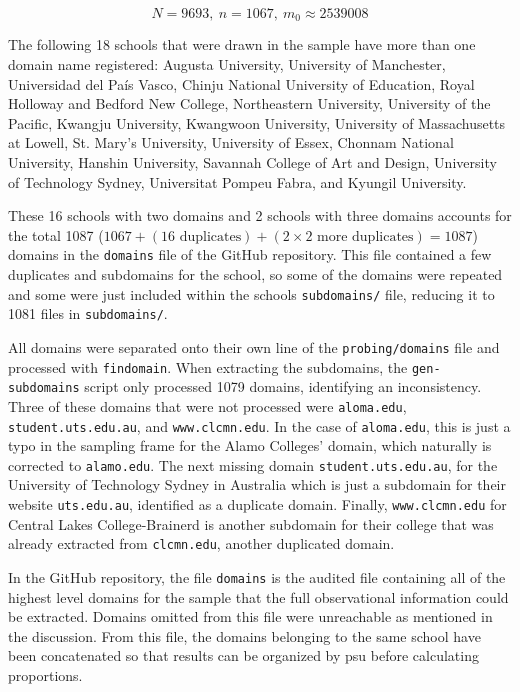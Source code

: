 \documentclass{article}
\theoremstyle{definition}
\begin{document}
\begin{flushleft}
\begin{multicols}{2}
$$
	N=9693, \ n=1067, \ m_0\approx2539008
$$

The following 18 schools that were drawn in the sample
have more than one domain name registered:
Augusta University,
University of Manchester,
Universidad del País Vasco,
Chinju National University of Education,
Royal Holloway and Bedford New College,
Northeastern University,
University of the Pacific,
Kwangju University,
Kwangwoon University,
University of Massachusetts at Lowell,
St. Mary's University,
University of Essex,
Chonnam National University,
Hanshin University,
Savannah College of Art and Design,
University of Technology Sydney,
Universitat Pompeu Fabra, and
Kyungil University.

These 16 schools with two domains and 2 schools with three domains
accounts for the total 1087 ($1067 + (16 \textrm{ duplicates}) +
(2\times2 \textrm{ more duplicates}) = 1087$) domains in the
\texttt{domains} file of the GitHub repository. This file
contained a few duplicates and subdomains for the school,
so some of the domains were repeated and some were just included within
the schools \texttt{subdomains/} file, reducing it to 1081 files
in \texttt{subdomains/}.

All domains were separated onto their own line of the \texttt{probing/domains}
file and processed with \texttt{findomain}.
When extracting the subdomains, the \texttt{gen-subdomains}
script only processed 1079 domains, identifying an inconsistency.
Three of these domains that were not processed were \texttt{aloma.edu},
\texttt{student.uts.edu.au}, and \texttt{www.clcmn.edu}. In the case of
\texttt{aloma.edu}, this is just a typo in the sampling frame for the
Alamo Colleges' domain, which naturally is corrected to \texttt{alamo.edu}.
The next missing domain \texttt{student.uts.edu.au}, for the University
of Technology Sydney in Australia which is just a subdomain for their
website \texttt{uts.edu.au}, identified as a duplicate domain.
Finally, \texttt{www.clcmn.edu} for
Central Lakes College-Brainerd is another subdomain for their college
that was already extracted from \texttt{clcmn.edu}, another duplicated domain.

In the GitHub repository, the file \texttt{domains} is the audited file containing all
of the highest level domains for the sample that the full observational information could
be extracted. Domains omitted from this file were unreachable as mentioned in the discussion.
From this file, the domains belonging to the same school have been concatenated
so that results can be organized by psu before calculating proportions.



\end{multicols}
\end{flushleft}
\end{document}
